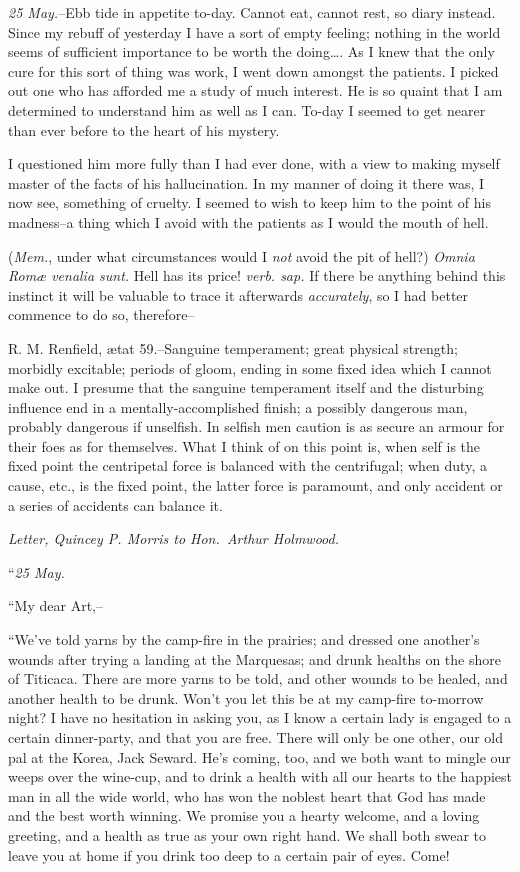 \documentclass[12pt,openright]{book}
\begin{document}
\textit{25 May.}–Ebb tide in appetite to-day. Cannot eat, cannot rest, so diary instead. Since my rebuff of yesterday I have a sort of empty feeling; nothing in the world seems of sufficient importance to be worth the doing…. As I knew that the only cure for this sort of thing was work, I went down amongst the patients. I picked out one who has afforded me a study of much interest. He is so quaint that I am determined to understand him as well as I can. To-day I seemed to get nearer than ever before to the heart of his mystery.

I questioned him more fully than I had ever done, with a view to making myself master of the facts of his hallucination. In my manner of doing it there was, I now see, something of cruelty. I seemed to wish to keep him to the point of his madness–a thing which I avoid with the patients as I would the mouth of hell.

(\textit{Mem.}, under what circumstances would I \textit{not} avoid the pit of hell?) \textit{Omnia Romæ venalia sunt.} Hell has its price! \textit{verb. sap.} If there be anything behind this instinct it will be valuable to trace it afterwards \textit{accurately}, so I had better commence to do so, therefore–

R. M. Renfield, ætat 59.–Sanguine temperament; great physical strength; morbidly excitable; periods of gloom, ending in some fixed idea which I cannot make out. I presume that the sanguine temperament itself and the disturbing influence end in a mentally-accomplished finish; a possibly dangerous man, probably dangerous if unselfish. In selfish men caution is as secure an armour for their foes as for themselves. What I think of on this point is, when self is the fixed point the centripetal force is balanced with the centrifugal; when duty, a cause, etc., is the fixed point, the latter force is paramount, and only accident or a series of accidents can balance it.

\textit{Letter, Quincey P. Morris to Hon. Arthur Holmwood.}

“\textit{25 May.}

“My dear Art,–

“We’ve told yarns by the camp-fire in the prairies; and dressed one another’s wounds after trying a landing at the Marquesas; and drunk healths on the shore of Titicaca. There are more yarns to be told, and other wounds to be healed, and another health to be drunk. Won’t you let this be at my camp-fire to-morrow night? I have no hesitation in asking you, as I know a certain lady is engaged to a certain dinner-party, and that you are free. There will only be one other, our old pal at the Korea, Jack Seward. He’s coming, too, and we both want to mingle our weeps over the wine-cup, and to drink a health with all our hearts to the happiest man in all the wide world, who has won the noblest heart that God has made and the best worth winning. We promise you a hearty welcome, and a loving greeting, and a health as true as your own right hand. We shall both swear to leave you at home if you drink too deep to a certain pair of eyes. Come!
\end{document}
